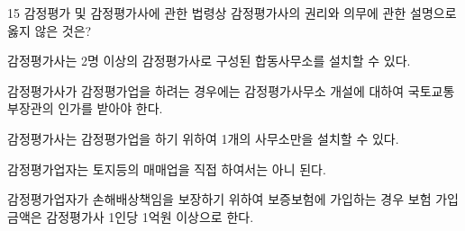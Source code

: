 \begin{question}{15}
감정평가 및 감정평가사에 관한 법령상 감정평가사의 권리와 의무에 관한 설명으로 옳지 않은 것은?
\begin{choices}
  \item 감정평가사는 2명 이상의 감정평가사로 구성된 합동사무소를 설치할 수 있다.
  \item 감정평가사가 감정평가업을 하려는 경우에는 감정평가사무소 개설에 대하여 국토교통부장관의 인가를 받아야 한다.
  \item 감정평가사는 감정평가업을 하기 위하여 1개의 사무소만을 설치할 수 있다.
  \item 감정평가업자는 토지등의 매매업을 직접 하여서는 아니 된다.
  \item 감정평가업자가 손해배상책임을 보장하기 위하여 보증보험에 가입하는 경우 보험 가입 금액은 감정평가사 1인당 1억원 이상으로 한다.
\end{choices}
\end{question}
